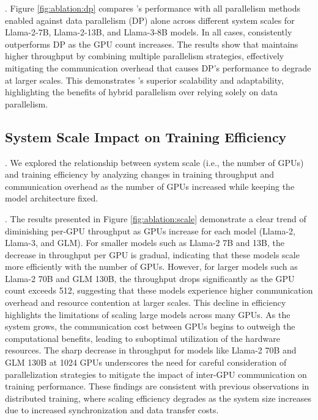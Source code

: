 .
Figure \ref{fig:ablation:dp} compares \sysname’s performance with all parallelism methods enabled against data parallelism (DP) alone across different system scales for Llama-2-7B, Llama-2-13B, and Llama-3-8B models. In all cases, \sysname consistently outperforms DP as the GPU count increases. The results show that \sysname maintains higher throughput by combining multiple parallelism strategies, effectively mitigating the communication overhead that causes DP's performance to degrade at larger scales. This demonstrates \sysname's superior scalability and adaptability, highlighting the benefits of hybrid parallelism over relying solely on data parallelism.

\subsection{System Scale Impact on Training Efficiency}

.
We explored the relationship between system scale (i.e., the number of GPUs) and training efficiency by analyzing changes in training throughput and communication overhead as the number of GPUs increased while keeping the model architecture fixed.

.
The results presented in Figure \ref{fig:ablation:scale} demonstrate a clear trend of diminishing per-GPU throughput as GPUs increase for each model (Llama-2, Llama-3, and GLM). For smaller models such as Llama-2 7B and 13B, the decrease in throughput per GPU is gradual, indicating that these models scale more efficiently with the number of GPUs. However, for larger models such as Llama-2 70B and GLM 130B, the throughput drops significantly as the GPU count exceeds 512, suggesting that these models experience higher communication overhead and resource contention at larger scales. 
This decline in efficiency highlights the limitations of scaling large models across many GPUs. As the system grows, the communication cost between GPUs begins to outweigh the computational benefits, leading to suboptimal utilization of the hardware resources. The sharp decrease in throughput for models like Llama-2 70B and GLM 130B at 1024 GPUs underscores the need for careful consideration of parallelization strategies to mitigate the impact of inter-GPU communication on training performance. These findings are consistent with previous observations in distributed training, where scaling efficiency degrades as the system size increases due to increased synchronization and data transfer costs.

